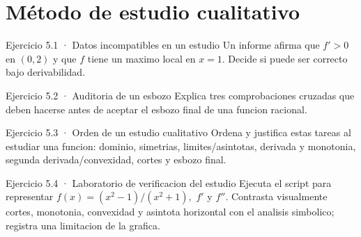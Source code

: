 \documentclass[10pt,a4paper,oneside,openany]{book}
\begin{document}
\section{Método de estudio cualitativo}
\begin{PSevenExerciseFixed}{Ejercicio 5.1 · Datos incompatibles en un estudio}
Un informe afirma que \(f'>0\) en \((0,2)\) y que \(f\) tiene un maximo local en \(x=1\). Decide si puede ser correcto bajo derivabilidad.
\end{PSevenExerciseFixed}
\begin{PSevenExerciseFixed}{Ejercicio 5.2 · Auditoria de un esbozo}
Explica tres comprobaciones cruzadas que deben hacerse antes de aceptar el esbozo final de una funcion racional.
\end{PSevenExerciseFixed}
\begin{PSevenExerciseFixed}{Ejercicio 5.3 · Orden de un estudio cualitativo}
Ordena y justifica estas tareas al estudiar una funcion: dominio, simetrias, limites/asintotas, derivada y monotonia, segunda derivada/convexidad, cortes y esbozo final.
\end{PSevenExerciseFixed}
\begin{PSevenExerciseFixed}{Ejercicio 5.4 · Laboratorio de verificacion del estudio}
Ejecuta el script para representar \(f(x)=(x^{2}-1)/(x^{2}+1),\) \(f'\) y \(f''\). Contrasta visualmente cortes, monotonia, convexidad y asintota horizontal con el analisis simbolico; registra una limitacion de la grafica.
\end{PSevenExerciseFixed}
\end{document}
